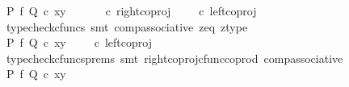 \begin{isabellebody}
\ {\isachardoublequoteopen}{\isacharparenleft}{\kern0pt}P\ {\isasymtimes}\isactrlsub f\ Q{\isacharparenright}{\kern0pt}\ {\isasymcirc}\isactrlsub c\ {\isasymlangle}x{\isacharcomma}{\kern0pt}y{\isasymrangle}\ {\isacharequal}{\kern0pt}\ {\isacharparenleft}{\kern0pt}{\isasymlangle}{\isasymt}{\isacharcomma}{\kern0pt}{\isasymt}{\isasymrangle}\ {\isasymamalg}\ {\isasymlangle}{\isasymf}{\isacharcomma}{\kern0pt}{\isasymf}{\isasymrangle}\ {\isasymamalg}\ {\isasymlangle}{\isasymf}{\isacharcomma}{\kern0pt}{\isasymt}{\isasymrangle}{\isacharparenright}{\kern0pt}\ {\isasymcirc}\isactrlsub c\ right{\isacharunderscore}{\kern0pt}coproj\ {\isasymone}\ {\isacharparenleft}{\kern0pt}{\isasymone}\ {\isasymCoprod}\ {\isasymone}{\isacharparenright}{\kern0pt}\ {\isasymcirc}\isactrlsub c\ left{\isacharunderscore}{\kern0pt}coproj\ {\isasymone}\ {\isasymone}{\isachardoublequoteclose}\isanewline
\ \ \ \ \ \ \ \ \isamarkupfalse%
\ {\isacharparenleft}{\kern0pt}typecheck{\isacharunderscore}{\kern0pt}cfuncs{\isacharcomma}{\kern0pt}\ smt\ comp{\isacharunderscore}{\kern0pt}associative{}\ z{\isacharunderscore}{\kern0pt}eq\ z{\isacharunderscore}{\kern0pt}type{\isacharparenright}{\kern0pt}\isanewline
\ \ \ \ \ \ \isamarkupfalse%
\ \isamarkupfalse%
\ {\isachardoublequoteopen}{\isacharparenleft}{\kern0pt}P\ {\isasymtimes}\isactrlsub f\ Q{\isacharparenright}{\kern0pt}\ {\isasymcirc}\isactrlsub c\ {\isasymlangle}x{\isacharcomma}{\kern0pt}y{\isasymrangle}\ {\isacharequal}{\kern0pt}\ {\isacharparenleft}{\kern0pt}{\isasymlangle}{\isasymf}{\isacharcomma}{\kern0pt}{\isasymf}{\isasymrangle}\ {\isasymamalg}\ {\isasymlangle}{\isasymf}{\isacharcomma}{\kern0pt}{\isasymt}{\isasymrangle}{\isacharparenright}{\kern0pt}\ {\isasymcirc}\isactrlsub c\ left{\isacharunderscore}{\kern0pt}coproj\ {\isasymone}\ {\isasymone}{\isachardoublequoteclose}\isanewline
\ \ \ \ \ \ \ \ \isamarkupfalse%
\ {\isacharparenleft}{\kern0pt}typecheck{\isacharunderscore}{\kern0pt}cfuncs{\isacharunderscore}{\kern0pt}prems{\isacharcomma}{\kern0pt}\ smt\ right{\isacharunderscore}{\kern0pt}coproj{\isacharunderscore}{\kern0pt}cfunc{\isacharunderscore}{\kern0pt}coprod\ comp{\isacharunderscore}{\kern0pt}associative{}{\isacharparenright}{\kern0pt}\isanewline
\ \ \ \ \ \ \isamarkupfalse%
\ \isamarkupfalse%
\ {\isachardoublequoteopen}{\isacharparenleft}{\kern0pt}P\ {\isasymtimes}\isactrlsub f\ Q{\isacharparenright}{\kern0pt}\ {\isasymcirc}\isactrlsub c\ {\isasymlangle}x{\isacharcomma}{\kern0pt}y{\isasymrangle}\ {\isacharequal}{\kern0pt}\ {\isasymlangle}{\isasymf}{\isacharcomma}{\kern0pt}{\isasymf}{\isasymrangle}{\isachardoublequoteclose}\isanewline

\end{isabellebody}

